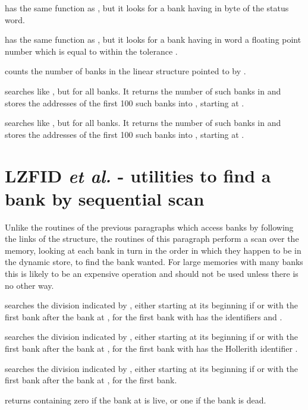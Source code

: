 
has the same function as ,
but it looks for a bank having  in byte 
of the status word.


has the same function as ,
but it looks for a bank having in word  a floating point number
which is equal to  within the tolerance .


counts the number of banks in the linear
structure pointed to by .


searches like , but for all banks.
It returns the number of such banks in 
and stores the addresses of the first 100 such banks into \IQUEST,
starting at .


searches like , but for all banks.
It returns the number of such banks in 
and stores the addresses of the first 100 such banks into \IQUEST,
starting at .

\section{LZFID {\it et al.} - utilities to find a bank by sequential scan}

Unlike the routines of the previous paragraphs which access
banks by following the links of the structure,
the routines of this paragraph perform a scan over the memory,
looking at each bank in turn in the order in which they happen
to be in the dynamic store,
to find the bank wanted.
For large memories with many banks this is likely to be an expensive
operation and should not be used unless there is no other way.



searches the division indicated by , either starting
at its beginning if  or with the first bank after the bank
at , for the first bank with has the identifiers  and .



searches the division indicated by , either starting
at its beginning if  or with the first bank after the bank
at , for the first bank with has the Hollerith identifier .



searches the division indicated by , either starting
at its beginning if  or with the first bank after the bank
at , for the first bank.

 returns  containing zero 
if the bank at  is live, or one if the bank is dead.

